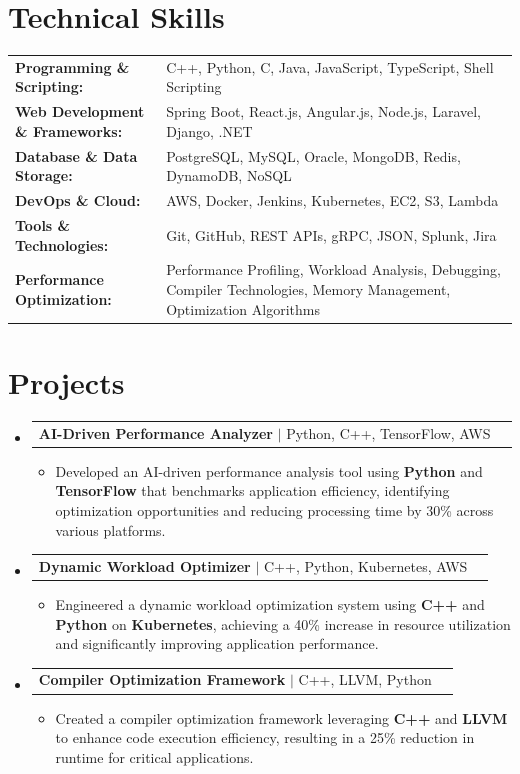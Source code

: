\documentclass[letterpaper,10pt]{article}
\makeatletter
\newcommand{\resumeItem}[1]{
  \item{\fontsize{8pt}{9pt}\selectfont
    #1 \vspace{-3pt}
  }
}
\newcommand{\resumeProjectHeading}[2]{
    \item
    \begin{tabular*}{1.001\textwidth}{l@{\extracolsep{\fill}}r}
      \fontsize{8.5pt}{10pt}#1 & \textbf{\fontsize{8.5pt}{10pt} #2}\\
    \end{tabular*}\vspace{-7pt}
}
\newcommand{\resumeSubHeadingListStart}{\begin{itemize}[leftmargin=0pt, label={}]}
\newcommand{\resumeSubHeadingListEnd}{\end{itemize}}
\newcommand{\resumeItemListStart}{\begin{itemize}[leftmargin=*]}
\newcommand{\resumeItemListEnd}{\end{itemize}\vspace{-5pt}}
\makeatother
\begin{document}
\section{Technical Skills}
        \vspace{-14pt}
        \begin{table}[h]
            \fontsize{8pt}{9pt}\selectfont
            \begin{tabular}{p{0.3\linewidth} p{0.7\linewidth}}
                \textbf{Programming \& Scripting:} & C++, Python, C, Java, JavaScript, TypeScript, Shell Scripting \\
                \textbf{Web Development \& Frameworks:} & Spring Boot, React.js, Angular.js, Node.js, Laravel, Django, .NET \\
                \textbf{Database \& Data Storage:} & PostgreSQL, MySQL, Oracle, MongoDB, Redis, DynamoDB, NoSQL \\
                \textbf{DevOps \& Cloud:} & AWS, Docker, Jenkins, Kubernetes, EC2, S3, Lambda \\
                \textbf{Tools \& Technologies:} & Git, GitHub, REST APIs, gRPC, JSON, Splunk, Jira \\
                \textbf{Performance Optimization:} & Performance Profiling, Workload Analysis, Debugging, Compiler Technologies, Memory Management, Optimization Algorithms \\
            \end{tabular}
        \end{table}
 \vspace{-18pt}

\section{Projects}
    \vspace{-5pt}
    \resumeSubHeadingListStart
          \resumeProjectHeading
            {\textbf{AI-Driven Performance Analyzer} $|$ Python, C++, TensorFlow, AWS}{}
            \resumeItemListStart
                \resumeItem{Developed an AI-driven performance analysis tool using \textbf{Python} and \textbf{TensorFlow} that benchmarks application efficiency, identifying optimization opportunities and reducing processing time by 30\% across various platforms.}
            \resumeItemListEnd
        \vspace{-12pt}
    
        \resumeProjectHeading
            {\textbf{Dynamic Workload Optimizer} $|$ C++, Python, Kubernetes, AWS}{}
        \resumeItemListStart
                \resumeItem{Engineered a dynamic workload optimization system using \textbf{C++} and \textbf{Python} on \textbf{Kubernetes}, achieving a 40\% increase in resource utilization and significantly improving application performance.}
        \resumeItemListEnd
      \vspace{-12pt}
      \resumeProjectHeading
        {\textbf{Compiler Optimization Framework} $|$ C++, LLVM, Python}{}
    \resumeItemListStart
            \resumeItem{Created a compiler optimization framework leveraging \textbf{C++} and \textbf{LLVM} to enhance code execution efficiency, resulting in a 25\% reduction in runtime for critical applications.}
    \resumeItemListEnd
    \resumeSubHeadingListEnd
\end{document}
